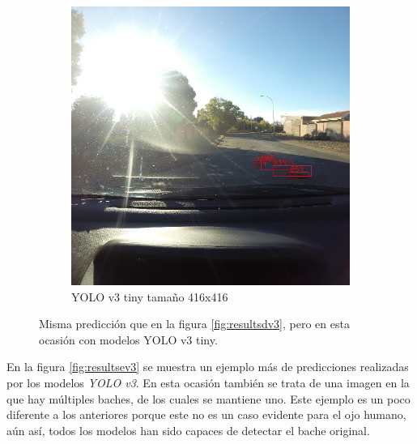 \begin{figure}[H]
\begin{subfigure}[h]{0.45\linewidth}
		\includegraphics[width=\linewidth]{images/results_d_yolo_v3_tiny_416.jpg}
		\caption{YOLO v3 tiny tamaño 416x416}
	\end{subfigure}
	\caption{Misma predicción que en la figura \ref{fig:resultsdv3}, pero en esta ocasión con modelos YOLO v3 tiny.}
	\label{fig:resultsdv3tiny}
\end{figure}

En la figura \ref{fig:resultsev3} se muestra un ejemplo más de predicciones realizadas por los modelos \textit{YOLO v3}. En esta ocasión también se trata de una imagen en la que hay múltiples baches, de los cuales se mantiene uno. Este ejemplo es un poco diferente a los anteriores porque este no es un caso evidente para el ojo humano, aún así, todos los modelos han sido capaces de detectar el bache original.

